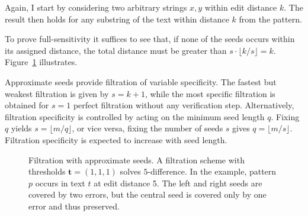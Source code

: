 Again, I start by considering two arbitrary strings $x,y$ within edit distance $k$.
The result then holds for any substring of the text within distance $k$ from the pattern.
To prove full-sensitivity it suffices to see that, if none of the seeds occurs within its assigned distance, the total distance must be greater than $s \cdot \lfloor k/s \rfloor = k$.
Figure~\ref{fig:seeds-apx} illustrates.

Approximate seeds provide filtration of variable specificity.
The fastest but weakest filtration is given by $s=k+1$, while the most specific filtration is obtained for $s=1$ \ie perfect filtration without any verification step.
Alternatively, filtration specificity is controlled by acting on the minimum seed length $q$.
Fixing $q$ yields $s = \lfloor m/q \rfloor$, or vice versa, fixing the number of seeds $s$ gives $q =\lfloor m/s \rfloor$.
Filtration specificity is expected to increase with seed length.

\begin{figure}[h]
\begin{center}
\caption[Filtration with approximate seeds]{Filtration with approximate seeds. A filtration scheme with thresholds $\mathbf{t} = (1,1,1)$ solves $5$-difference. In the example, pattern $p$ occurs in text $t$ at edit distance 5. The left and right seeds are covered by two errors, but the central seed is covered only by one error and thus preserved.}
\label{fig:seeds-apx}

\end{center}
\end{figure}


